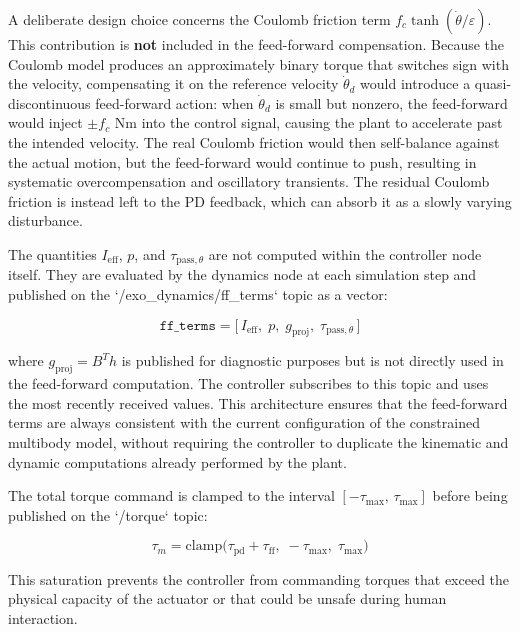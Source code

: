 A deliberate design choice concerns the Coulomb friction term $f_c\tanh(\dot\theta/\varepsilon)$. This contribution is \textbf{not} included in the feed-forward compensation. Because the Coulomb model produces an approximately binary torque that switches sign with the velocity, compensating it on the reference velocity $\dot\theta_d$ would introduce a quasi-discontinuous feed-forward action: when $\dot\theta_d$ is small but nonzero, the feed-forward would inject $\pm f_c$ Nm into the control signal, causing the plant to accelerate past the intended velocity. The real Coulomb friction would then self-balance against the actual motion, but the feed-forward would continue to push, resulting in systematic overcompensation and oscillatory transients. The residual Coulomb friction is instead left to the PD feedback, which can absorb it as a slowly varying disturbance.

The quantities $I_{\mathrm{eff}}$, $p$, and $\tau_{\mathrm{pass},\theta}$ are not computed within the controller node itself. They are evaluated by the dynamics node at each simulation step and published on the `/exo\_dynamics/ff\_terms` topic as a vector:

\begin{equation}
    \mathtt{ff\_terms} = \bigl[\,I_{\mathrm{eff}},\; p,\; g_{\mathrm{proj}},\; \tau_{\mathrm{pass},\theta}\,\bigr]
\end{equation}

where $g_{\mathrm{proj}} = B^T h$ is published for diagnostic purposes but is not directly used in the feed-forward computation. The controller subscribes to this topic and uses the most recently received values. This architecture ensures that the feed-forward terms are always consistent with the current configuration of the constrained multibody model, without requiring the controller to duplicate the kinematic and dynamic computations already performed by the plant.
 
The total torque command is clamped to the interval $[-\tau_{\max},\,\tau_{\max}]$ before being published on the `/torque` topic:

\begin{equation}
    \tau_m = \mathrm{clamp}\!\bigl(\tau_{\mathrm{pd}} + \tau_{\mathrm{ff}},\;-\tau_{\max},\;\tau_{\max}\bigr)
\end{equation}

This saturation prevents the controller from commanding torques that exceed the physical capacity of the actuator or that could be unsafe during human interaction.

